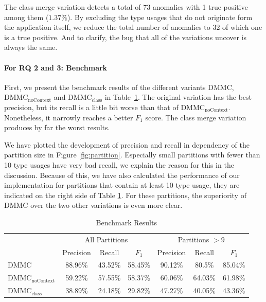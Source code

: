 The class merge variation detects a total of 73 anomalies with 1 true positive among them ($1.37\%$).
By excluding the type usages that do not originate form the application itself, we reduce the total number of anomalies to 32 of which one is a true positive.
And to clarify, the bug that all of the variations uncover is always the same.

\paragraph{For RQ 2 and 3: Benchmark}

First, we present the benchmark results of the different variants $\text{DMMC}$, $\text{DMMC}_\text{noContext}$ and $\text{DMMC}_\text{class}$ in Table~\ref{fig:bench}.
The original variation has the best precision, but its recall is a little bit worse than that of $\text{DMMC}_\text{noContext}$.
Nonetheless, it narrowly reaches a better $F_1$ score.
The class merge variation produces by far the worst results.

We have plotted the development of precision and recall in dependency of the partition size in Figure \ref{fig:partition}.
Especially small partitions with fewer than 10 type usages have very bad recall, we explain the reason for this in the discussion.
Because of this, we have also calculated the performance of our implementation for partitions that contain at least 10 type usage, they are indicated on the right side of Table \ref{fig:bench}.
For these partitions, the superiority of $\text{DMMC}$ over the two other variations is even more clear.

\begin{table}[t]
    \centering
    \begin{tabular}[h]{l|c|c|c|c|c|c}
\toprule
 & \multicolumn{3}{c|}{All Partitions}      & \multicolumn{3}{c}{Partitions $> 9$} \\
                                 & Precision & Recall  & $F_1$   & Precision & Recall  & $F_1$ \\
\midrule
$\text{DMMC}$                    & 88.96\%   & 43.52\% & 58.45\% & 90.12\%   & 80.5\%  & 85.04\% \\
$\text{DMMC}_\text{noContext}$   & 59.22\%   & 57.55\% & 58.37\% & 60.06\%   & 64.03\% & 61.98\% \\
$\text{DMMC}_\text{class}$       & 38.89\%   & 24.18\% & 29.82\% & 47.27\%   & 40.05\% & 43.36\% \\
\bottomrule
    \end{tabular}
    \caption{Benchmark Results}\label{fig:bench}
\end{table}

